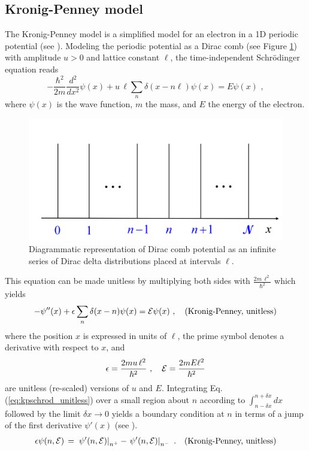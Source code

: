\subsection{Kronig-Penney model}
\label{subsec:kp}
\noindent
The Kronig-Penney model is a simplified model for an electron in a 1D periodic potential
(see \cite{Kittel1996_Solid_State}).
Modeling the periodic potential as a Dirac comb (see Figure \ref{fig:dirac_comb}) with amplitude $u>0$
and lattice constant $\ell$, the time-independent Schr\"odinger equation reads
%
\begin{equation} \label{eq:kpschrod}
- \frac{\hbar^2}{2 m} \frac{d^2}{dx^2} \psi(x) + u \, \ell \sum_n \delta(x - n \ell) \psi(x) = E \psi(x) \, \, , 
\end{equation}
%
where $\psi(x)$ is the wave function, $m$ the mass, and $E$ the energy 
of the electron.
%
\begin{figure}
    \centering
    \includegraphics[width=\textwidth, keepaspectratio]{figures/system/dirac_comb.png}
    \caption{Diagrammatic representation of Dirac comb potential as an infinite series of Dirac delta distributions placed at intervals $\ell$.}
    \label{fig:dirac_comb}
\end{figure}
%
This equation can be made unitless by multiplying both sides
with $\displaystyle \frac{2 m \, \ell^2}{\hbar^2}$ which yields
%
\begin{equation} \label{eq:kpschrod_unitless}
- \psi''(x) + \epsilon \sum_n \delta(x - n) \psi(x) = {\cal E} \psi(x) \, \, , \quad \text{(Kronig-Penney, unitless)} 
\end{equation}
%
where the position $x$ is expressed in units of $\ell$, the prime symbol denotes a derivative
with respect to $x$, and
%
\begin{equation} \label{eq:kpschrod_param}
\epsilon = \frac{2 m u \, \ell^2}{\hbar^2} \, \, , \quad {\cal E} = \frac{2 m E \ell^2}{\hbar^2}
\end{equation}
%
are unitless (re-scaled) versions of $u$ and $E$.
\newpage
Integrating Eq.\,(\ref{eq:kpschrod_unitless}) over a small region about  
$n$ according to $\displaystyle \int_{n - \delta x}^{n + \delta x} dx$ \,
followed by the limit $\delta x \to 0$ yields
a boundary condition at $n$ in terms of a jump of the first derivative $\psi'(x)$ (see \cite{Kittel1996_Solid_State}).
%
\begin{equation}\label{eq:kpjump}
\epsilon \psi(n,{\cal E}) \, = \, 
\left. \psi'(n,{\cal E}) \right|_{n^{+}} - \left. \psi'(n,{\cal E}) \right|_{n^{-}} \, \, .
\quad \text{(Kronig-Penney, unitless)}
\end{equation}

